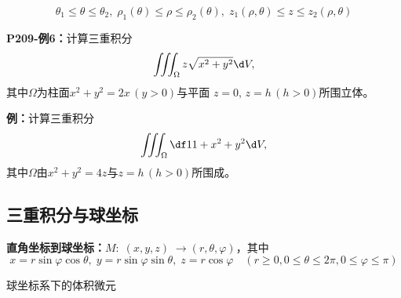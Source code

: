 $$\theta_1\leq\theta\leq\theta_2,\;
\rho_1(\theta)\leq\rho\leq\rho_2(\theta),\;
z_1(\rho,\theta)\leq z\leq z_2(\rho,\theta)$$

{\bf P209-例6：}计算三重积分
$$\iiint_{\Omega}z\sqrt{x^2+y^2}\d V,$$
其中$\Omega$为柱面$x^2+y^2=2x\,(y>0)$与平面
$z=0,\,z=h\,(h>0)$所围立体。

{\bf 例：}计算三重积分
$$\iiint_{\Omega}\df 1{1+x^2+y^2}\d V,$$
其中$\Omega$由$x^2+y^2=4z$与$z=h\,(h>0)$所围成。

\subsection{三重积分与球坐标}

{\bf 直角坐标到球坐标：}$M:\;(x,y,z)\;\to(r,\theta,\varphi)$，其中
$$x=r\sin\varphi\cos\theta,\;y=r\sin\varphi\sin\theta,\;z=r\cos\varphi
\quad(r\geq 0,0\leq\theta\leq 2\pi,0\leq\varphi\leq\pi)$$

\begin{center}
\end{center}

球坐标系下的体积微元

